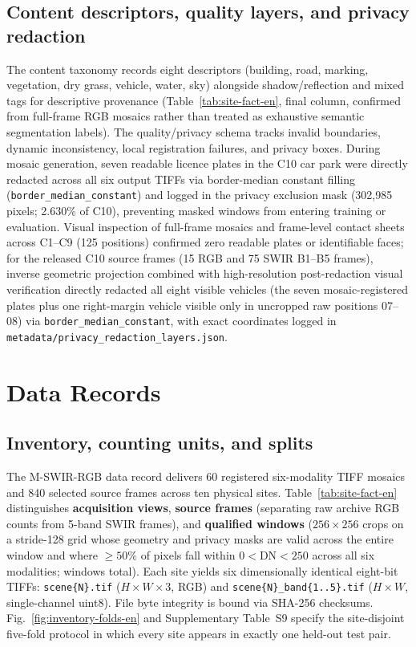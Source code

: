 \documentclass[a4paper,10pt]{article}
\begin{document}
\subsection{Content descriptors, quality layers, and privacy redaction}
The content taxonomy records eight descriptors (building, road, marking, vegetation, dry grass, vehicle, water, sky) alongside shadow/reflection and mixed tags for descriptive provenance (Table~\ref{tab:site-fact-en}, final column, confirmed from full-frame RGB mosaics rather than treated as exhaustive semantic segmentation labels). The quality/privacy schema tracks invalid boundaries, dynamic inconsistency, local registration failures, and privacy boxes. During mosaic generation, seven readable licence plates in the C10 car park were directly redacted across all six output TIFFs via border-median constant filling (\texttt{border\_median\_constant}) and logged in the privacy exclusion mask (302,985 pixels; 2.630\% of C10), preventing masked windows from entering training or evaluation. Visual inspection of full-frame mosaics and frame-level contact sheets across C1--C9 (125 positions) confirmed zero readable plates or identifiable faces; for the released C10 source frames (15 RGB and 75 SWIR B1--B5 frames), inverse geometric projection combined with high-resolution post-redaction visual verification directly redacted all eight visible vehicles (the seven mosaic-registered plates plus one right-margin vehicle visible only in uncropped raw positions 07--08) via \texttt{border\_median\_constant}, with exact coordinates logged in \texttt{metadata/privacy\_redaction\_layers.json}.

\section{Data Records}\label{sec:records-en}
\subsection{Inventory, counting units, and splits}
The M-SWIR-RGB data record \cite{du2026mswirrgb_data} delivers 60 registered six-modality TIFF mosaics and 840 selected source frames across ten physical sites. Table~\ref{tab:site-fact-en} distinguishes \textbf{acquisition views}, \textbf{source frames} (separating raw archive RGB counts from 5-band SWIR frames), and \textbf{qualified windows} ($256\times256$ crops on a stride-128 grid whose geometry and privacy masks are valid across the entire window and where $\ge 50\%$ of pixels fall within $0<\mathrm{DN}<250$ across all six modalities; \QualifiedWindowCount{} windows total). Each site yields six dimensionally identical eight-bit TIFFs: \texttt{scene\{N\}.tif} ($H\times W\times 3$, RGB) and \texttt{scene\{N\}\_band\{1..5\}.tif} ($H\times W$, single-channel uint8). File byte integrity is bound via SHA-256 checksums. Fig.~\ref{fig:inventory-folds-en} and Supplementary Table~S9 specify the site-disjoint five-fold protocol in which every site appears in exactly one held-out test pair.
\end{document}

